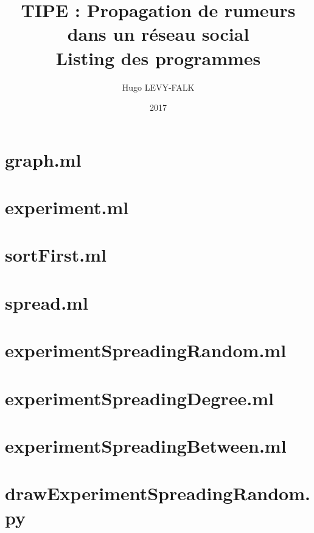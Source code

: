 \documentclass{article}
\title{TIPE : Propagation de rumeurs dans un réseau social\\Listing des programmes}
\author{Hugo LEVY-FALK}
\date{2017}
\begin{document}
\maketitle
{}\;
\tableofcontents
\newpage

\lstset{language=Caml, tabsize=2}          %
\section{graph.ml}


\section{experiment.ml}


\section{sortFirst.ml}


\section{spread.ml}


\section{experimentSpreadingRandom.ml}


\section{experimentSpreadingDegree.ml}


\section{experimentSpreadingBetween.ml}


\section{drawExperimentSpreadingRandom.py}

\end{document}
